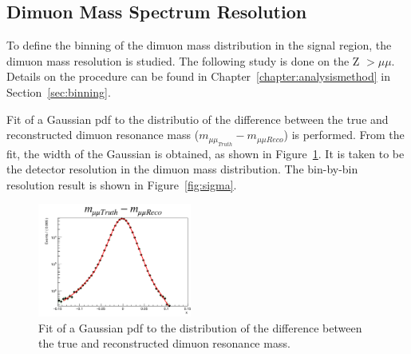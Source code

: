 %


\subsection{Dimuon Mass Spectrum Resolution}
To define the binning of the dimuon mass distribution in the signal region, the dimuon mass resolution is studied. The following study is done on the Z $> \mu \mu$. Details on the procedure can be found in Chapter~\ref{chapter:analysismethod} in Section~\ref{sec:binning}.

Fit of a Gaussian pdf to the distributio of the difference between the true and reconstructed dimuon resonance mass ($m_{\mu\mu_{Truth}} - m_{\mu\mu{Reco}}$) is performed. From the fit, the width of the Gaussian is obtained, as shown in Figure~\ref{fig:fit}. It is taken to be the detector resolution in the dimuon mass distribution. The bin-by-bin resolution result is shown in Figure~\ref{fig:sigma}.    

\begin{figure}[!htb]
    \begin{center}
        \includegraphics[width=0.45\textwidth]{figures/chapter_dimuon/fitError}        
        \caption
	{
	    Fit of a Gaussian pdf to the distribution of the difference between the true and reconstructed dimuon resonance mass. 
	}
        \label{fig:fit}
    \end{center}
\end{figure}
\FloatBarrier
   
